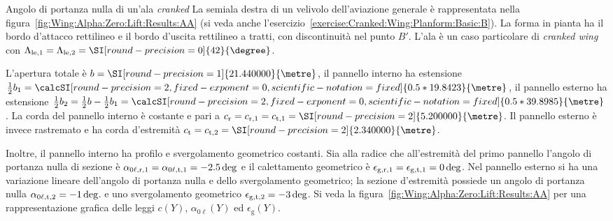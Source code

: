 %

%
\begin{myExampleX}{Angolo di portanza nulla di un'ala \emph{cranked}}{}%
\label{example:Wing:Alpha:Zero:Lift:AA}
%
\noindent
La semiala destra di un velivolo dell'aviazione generale è rappresentata
nella figura~\ref{fig:Wing:Alpha:Zero:Lift:Results:AA} (si veda anche
l'esercizio~\ref{exercise:Cranked:Wing:Planform:Basic:B}).
La forma in pianta ha il bordo d'attacco rettilineo e il bordo d'uscita
rettilineo a tratti, con discontinuità nel punto $B'$.
L'ala è un caso particolare di \emph{cranked wing} con
$\Lambda_\mathrm{le,1}=\Lambda_\mathrm{le,2}=\SI[round-precision=0]{\mySweepLEWingIIDEG}{\degree}$.

L'apertura totale è $b=\SI[round-precision=1]{\mySpanWingMT}{\metre}$,
il pannello interno ha estensione
$\frac{1}{2}b_1=\calcSI[round-precision=2,fixed-exponent=0,scientific-notation=fixed]{0.5*\mySpanWingIMT}{\metre}$,
il pannello esterno ha estensione
$\frac{1}{2}b_2=\frac{1}{2}b-\frac{1}{2}b_1
=\calcSI[round-precision=2,fixed-exponent=0,scientific-notation=fixed]{0.5*\mySpanWingIIMT}{\metre}$.
La corda del pannello interno è costante e pari a 
$c_\mathrm{r}=c_{\mathrm{r},1}=c_{\mathrm{t},1}=\SI[round-precision=2]{\myChordRootWingMT}{\metre}$.
Il pannello esterno è invece rastremato e ha corda d'estremità
$c_\mathrm{t}=c_{\mathrm{t},2}=\SI[round-precision=2]{\myChordTipWingMT}{\metre}$.

Inoltre, il pannello interno ha profilo e svergolamento geometrico costanti.
Sia alla radice che all'estremità del primo pannello l'angolo di portanza nulla
di sezione è
$\alpha_{0\ell,\mathrm{r},1}=\alpha_{0\ell,\mathrm{t},1}=
\SI[round-precision=1]{\myAlphaZeroLiftRootWingIDEG}{\deg}$
e il calettamento geometrico è
$\epsilon_{\mathrm{g,r},1}=\epsilon_{\mathrm{g,t},1}=\SI[round-precision=0]{\myTwistWingIDEG}{\deg}$.
Nel pannello esterno si ha una variazione lineare dell'angolo di portanza nulla
e dello svergolamento geometrico;
la sezione d'estremità possiede un angolo di portanza nulla
$\alpha_{0\ell,\mathrm{t},2}=\SI[round-precision=1]{\myAlphaZeroLiftTipWingIIDEG}{\deg}$.
e uno svergolamento geometrico 
$\epsilon_{\mathrm{g,t},2}=\SI[round-precision=1]{\myTwistWingIIDEG}{\deg}$.
Si veda la figura~\ref{fig:Wing:Alpha:Zero:Lift:Results:AA} per una rappresentazione grafica
delle leggi $c(Y)$, $\alpha_{0\ell}(Y)$ ed $\epsilon_\mathrm{g}(Y)$.


\end{myExampleX}
